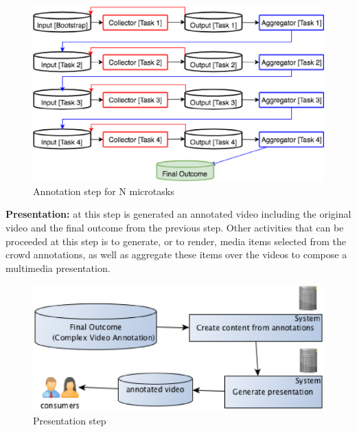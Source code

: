 \begin{figure}[h]
	\centerline{\includegraphics[scale=0.25] {figure/cascading}}
	\caption{Annotation step for N microtasks}
	\label{cascading}
\end{figure}

\textbf{Presentation:} at this step is generated an annotated video including the original video and the final outcome from the previous step. Other activities that can be proceeded at this step is to generate, or to render, media items selected from the crowd annotations, as well as aggregate these items over the videos to compose a multimedia presentation.

\begin{figure}[h]
	\centerline{\includegraphics[scale=0.5] {figure/presentation}}
	\caption{Presentation step}
	\label{presentation}
\end{figure}








